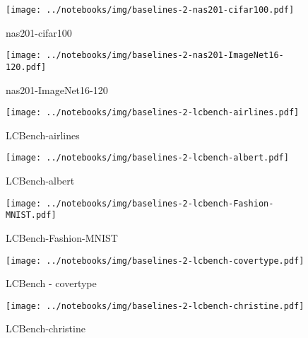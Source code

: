 \begin{figure}[H]
    \centering
    \texttt{[image: ../notebooks/img/baselines-2-nas201-cifar100.pdf]}
    \caption{nas201-cifar100}
\end{figure}

\begin{figure}[H]
    \centering
    \texttt{[image: ../notebooks/img/baselines-2-nas201-ImageNet16-120.pdf]}
    \caption{nas201-ImageNet16-120}
\end{figure}

\begin{figure}[H]
    \centering
    \texttt{[image: ../notebooks/img/baselines-2-lcbench-airlines.pdf]}
    \caption{LCBench-airlines}
\end{figure}

\begin{figure}[H]
    \centering
    \texttt{[image: ../notebooks/img/baselines-2-lcbench-albert.pdf]}
    \caption{LCBench-albert}
\end{figure}

\begin{figure}[H]
    \centering
    \texttt{[image: ../notebooks/img/baselines-2-lcbench-Fashion-MNIST.pdf]}
    \caption{LCBench-Fashion-MNIST}
\end{figure}

\begin{figure}[H]
    \centering
    \texttt{[image: ../notebooks/img/baselines-2-lcbench-covertype.pdf]}
    \caption{LCBench - covertype}
\end{figure}

\begin{figure}[H]
    \centering
    \texttt{[image: ../notebooks/img/baselines-2-lcbench-christine.pdf]}
    \caption{LCBench-christine}
\end{figure}
